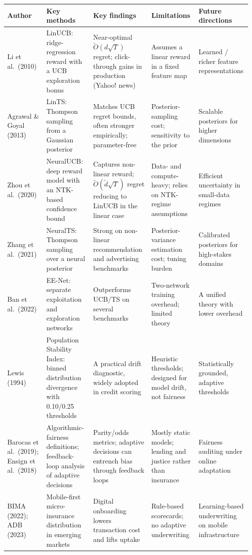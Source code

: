 {\def\LTcaptype{none}
\small
\begin{longtable}[]{@{}
  >{\raggedright\arraybackslash}p{}
  >{\raggedright\arraybackslash}p{}
  >{\raggedright\arraybackslash}p{}
  >{\raggedright\arraybackslash}p{}
  >{\raggedright\arraybackslash}p{}@{}}
\toprule\noalign{}
\textbf{Author} & \textbf{Key methods} & \textbf{Key findings} & \textbf{Limitations} & \textbf{Future directions} \\
\midrule\noalign{}
\endhead
\bottomrule\noalign{}
\endlastfoot
Li et al.\ (2010) & LinUCB: ridge-regression reward with a UCB exploration bonus & Near-optimal $\tilde{O}(d\sqrt{T})$ regret; click-through gains in production (Yahoo! news) & Assumes a linear reward in a fixed feature map & Learned / richer feature representations \\
Agrawal \& Goyal (2013) & LinTS: Thompson sampling from a Gaussian posterior & Matches UCB regret bounds, often stronger empirically; parameter-free & Posterior-sampling cost; sensitivity to the prior & Scalable posteriors for higher dimensions \\
Zhou et al.\ (2020) & NeuralUCB: deep reward model with an NTK-based confidence bound & Captures non-linear reward; $\tilde{O}(\tilde{d}\sqrt{T})$ regret reducing to LinUCB in the linear case & Data- and compute-heavy; relies on NTK-regime assumptions & Efficient uncertainty in small-data regimes \\
Zhang et al.\ (2021) & NeuralTS: Thompson sampling over a neural posterior & Strong on non-linear recommendation and advertising benchmarks & Posterior-variance estimation cost; tuning burden & Calibrated posteriors for high-stakes domains \\
Ban et al.\ (2022) & EE-Net: separate exploitation and exploration networks & Outperforms UCB/TS on several benchmarks & Two-network training overhead; limited theory & A unified theory with lower overhead \\
Lewis (1994) & Population Stability Index: binned distribution divergence with 0.10/0.25 thresholds & A practical drift diagnostic, widely adopted in credit scoring & Heuristic thresholds; designed for model drift, not fairness & Statistically grounded, adaptive thresholds \\
Barocas et al.\ (2019); Ensign et al.\ (2018) & Algorithmic-fairness definitions; feedback-loop analysis of adaptive decisions & Parity/odds metrics; adaptive decisions can entrench bias through feedback loops & Mostly static models; lending and justice rather than insurance & Fairness auditing under online adaptation \\
BIMA (2022); ADB (2023) & Mobile-first micro-insurance distribution in emerging markets & Digital onboarding lowers transaction cost and lifts uptake & Rule-based scorecards; no adaptive underwriting & Learning-based underwriting on mobile infrastructure \\
\end{longtable}
}

